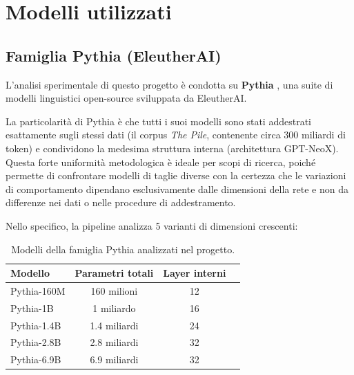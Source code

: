 \documentclass[../relazione.tex]{subfiles}
\begin{document}
\section{Modelli utilizzati}
\label{sec:modelli}

\subsection{Famiglia Pythia (EleutherAI)}

L'analisi sperimentale di questo progetto è condotta su \textbf{Pythia} \cite{biderman2023pythia}, una suite di modelli linguistici open-source sviluppata da EleutherAI. 

La particolarità di Pythia è che tutti i suoi modelli sono stati addestrati esattamente sugli stessi dati (il corpus \emph{The Pile}, contenente circa 300 miliardi di token) e condividono la medesima struttura interna (architettura GPT-NeoX). 
Questa forte uniformità metodologica è ideale per scopi di ricerca, poiché permette di confrontare modelli di taglie diverse con la certezza che le variazioni di comportamento dipendano esclusivamente dalle dimensioni della rete e non da differenze nei dati o nelle procedure di addestramento.


Nello specifico, la pipeline analizza 5 varianti di dimensioni crescenti:
\begin{table}[h]
\centering
\begin{tabular}{lccc}
\toprule
\textbf{Modello} & \textbf{Parametri totali}  & \textbf{Layer interni} \\
\midrule
Pythia-160M  & 160 milioni  & 12 \\
Pythia-1B    & 1 miliardo   & 16 \\
Pythia-1.4B  & 1.4 miliardi & 24 \\
Pythia-2.8B  & 2.8 miliardi & 32 \\
Pythia-6.9B  & 6.9 miliardi & 32 \\
\bottomrule
\end{tabular}
\caption{Modelli della famiglia Pythia analizzati nel progetto.}
\end{table}
\end{document}
